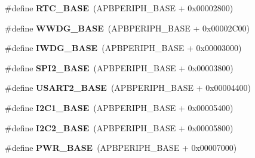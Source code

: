 \begin{DoxyCompactItemize}
\item 
\mbox{\label{group___peripheral__memory__map_ga4265e665d56225412e57a61d87417022}} 
\#define {\bfseries R\+T\+C\+\_\+\+B\+A\+SE}~(A\+P\+B\+P\+E\+R\+I\+P\+H\+\_\+\+B\+A\+SE + 0x00002800)
\item 
\mbox{\label{group___peripheral__memory__map_ga9a5bf4728ab93dea5b569f5b972cbe62}} 
\#define {\bfseries W\+W\+D\+G\+\_\+\+B\+A\+SE}~(A\+P\+B\+P\+E\+R\+I\+P\+H\+\_\+\+B\+A\+SE + 0x00002\+C00)
\item 
\mbox{\label{group___peripheral__memory__map_ga8543ee4997296af5536b007cd4748f55}} 
\#define {\bfseries I\+W\+D\+G\+\_\+\+B\+A\+SE}~(A\+P\+B\+P\+E\+R\+I\+P\+H\+\_\+\+B\+A\+SE + 0x00003000)
\item 
\mbox{\label{group___peripheral__memory__map_gac3e357b4c25106ed375fb1affab6bb86}} 
\#define {\bfseries S\+P\+I2\+\_\+\+B\+A\+SE}~(A\+P\+B\+P\+E\+R\+I\+P\+H\+\_\+\+B\+A\+SE + 0x00003800)
\item 
\mbox{\label{group___peripheral__memory__map_gade83162a04bca0b15b39018a8e8ec090}} 
\#define {\bfseries U\+S\+A\+R\+T2\+\_\+\+B\+A\+SE}~(A\+P\+B\+P\+E\+R\+I\+P\+H\+\_\+\+B\+A\+SE + 0x00004400)
\item 
\mbox{\label{group___peripheral__memory__map_gacd72dbffb1738ca87c838545c4eb85a3}} 
\#define {\bfseries I2\+C1\+\_\+\+B\+A\+SE}~(A\+P\+B\+P\+E\+R\+I\+P\+H\+\_\+\+B\+A\+SE + 0x00005400)
\item 
\mbox{\label{group___peripheral__memory__map_ga04bda70f25c795fb79f163b633ad4a5d}} 
\#define {\bfseries I2\+C2\+\_\+\+B\+A\+SE}~(A\+P\+B\+P\+E\+R\+I\+P\+H\+\_\+\+B\+A\+SE + 0x00005800)
\item 
\mbox{\label{group___peripheral__memory__map_gac691ec23dace8b7a649a25acb110217a}} 
\#define {\bfseries P\+W\+R\+\_\+\+B\+A\+SE}~(A\+P\+B\+P\+E\+R\+I\+P\+H\+\_\+\+B\+A\+SE + 0x00007000)
\item 
\mbox{\label{group___peripheral__memory__map_ga62246020bf3b34b6a4d8d0e84ec79d3d}} 

\end{DoxyCompactItemize}
